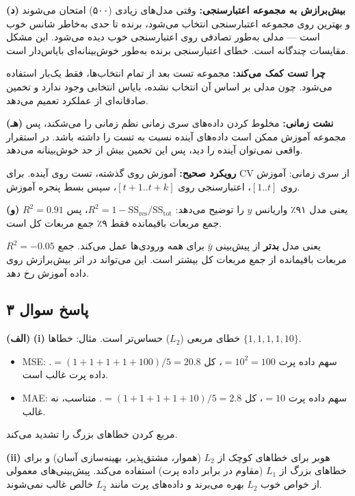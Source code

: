 \documentclass[12pt,a4paper]{article}
\begin{document}
\bigskip

\textbf{(د)} \textbf{بیش‌برازش به مجموعه اعتبارسنجی:} وقتی مدل‌های زیادی (۵۰۰) امتحان می‌شوند و بهترین روی مجموعه اعتبارسنجی انتخاب می‌شود، برنده تا حدی به‌خاطر شانس خوب است — مدلی به‌طور تصادفی روی اعتبارسنجی خوب دیده می‌شود. این مشکل مقایسات چندگانه است. خطای اعتبارسنجی برنده به‌طور خوش‌بینانه‌ای بایاس‌دار است.

\textbf{چرا تست کمک می‌کند:} مجموعه تست بعد از تمام انتخاب‌ها، فقط یک‌بار استفاده می‌شود. چون مدلی بر اساس آن انتخاب نشده، بایاس انتخابی وجود ندارد و تخمین صادقانه‌ای از عملکرد تعمیم می‌دهد.

\bigskip

\textbf{(هـ)} \textbf{نشت زمانی:} مخلوط کردن داده‌های سری زمانی نظم زمانی را می‌شکند، پس مجموعه آموزش ممکن است داده‌های آینده نسبت به تست را داشته باشد. در استقرار واقعی نمی‌توان آینده را دید، پس این تخمین بیش از حد خوش‌بینانه می‌دهد.

\textbf{رویکرد صحیح:} آموزش روی گذشته، تست روی آینده. برای CV از سری زمانی: آموزش روی $[1..t]$، اعتبارسنجی روی $[t+1..t+k]$، سپس بسط پنجره آموزش.

\bigskip

\textbf{(و)} $R^2 = 0.91$ یعنی مدل ۹۱٪ واریانس $y$ را توضیح می‌دهد: $R^2 = 1 - \text{SS}_{\text{res}}/\text{SS}_{\text{tot}}$، پس جمع مربعات باقیمانده فقط ۹٪ جمع مربعات کل است.

$R^2 = -0.05$ یعنی مدل \textbf{بدتر} از پیش‌بینی $\bar{y}$ برای همه ورودی‌ها عمل می‌کند. جمع مربعات باقیمانده از جمع مربعات کل بیشتر است. این می‌تواند در اثر بیش‌برازش روی داده آموزش رخ دهد.

\newpage

\subsection*{پاسخ سوال ۳}

\textbf{(الف)} \textbf{(i)} خطای مربعی ($L_2$) حساس‌تر است. مثال: خطاها $\{1, 1, 1, 1, 10\}$.
\begin{itemize}
\item MSE: سهم داده پرت $= 10^2 = 100$، کل $= (1+1+1+1+100)/5 = 20.8$. داده پرت غالب است.
\item MAE: سهم داده پرت $= 10$، کل $= (1+1+1+1+10)/5 = 2.8$. متناسب، نه غالب.
\end{itemize}
مربع کردن خطاهای بزرگ را تشدید می‌کند.

\textbf{(ii)} هوبر برای خطاهای کوچک از $L_2$ (هموار، مشتق‌پذیر، بهینه‌سازی آسان) و برای خطاهای بزرگ از $L_1$ (مقاوم در برابر داده پرت) استفاده می‌کند. پیش‌بینی‌های معمولی از خواص خوب $L_2$ بهره می‌برند و داده‌های پرت مانند $L_2$ خالص غالب نمی‌شوند.
\end{document}
